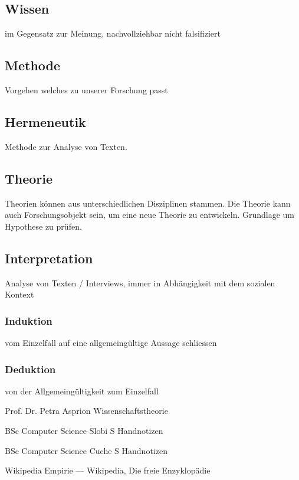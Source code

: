\documentclass[DIV=calc, paper=a4, fontsize=11pt, twocolumn]{scrartcl}	 %
\begin{document}
\subsection*{Wissen}
im Gegensatz zur Meinung, nachvollziehbar nicht falsifiziert

\subsection*{Methode}
Vorgehen welches zu unserer Forschung passt

\subsection*{Hermeneutik}
Methode zur Analyse von Texten.

\subsection*{Theorie}
Theorien können aus unterschiedlichen Disziplinen stammen. Die Theorie kann auch Forschungsobjekt sein, um eine neue Theorie zu entwickeln.
Grundlage um Hypothese zu pr\"ufen.

\subsection*{Interpretation}
Analyse von Texten / Interviews, immer in Abh\"angigkeit mit dem sozialen Kontext

\subsubsection*{Induktion}
vom Einzelfall auf eine allgemeing\"ultige Aussage schliessen

\subsubsection*{Deduktion}
von der Allgemeing\"ultigkeit zum Einzelfall

\begin{thebibliography}{99} %

Prof. Dr. Petra Asprion
\newblock Wissenschaftstheorie
 
BSc Computer Science Slobi S
\newblock Handnotizen

BSc Computer Science Cuche S
\newblock Handnotizen
 
 Wikipedia
 \newblock Empirie --- Wikipedia{,} Die freie Enzyklopädie
\end{thebibliography}

\end{document}
